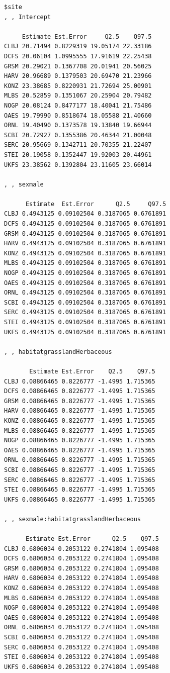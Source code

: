 \documentclass[
  13,
  letterpaper,
]{report}
\begin{document}
\begin{verbatim}
$site
, , Intercept

     Estimate Est.Error     Q2.5    Q97.5
CLBJ 20.71494 0.8229319 19.05174 22.33186
DCFS 20.06104 1.0995555 17.91619 22.25438
GRSM 20.29021 0.1367708 20.01941 20.56025
HARV 20.96689 0.1379503 20.69470 21.23966
KONZ 23.38685 0.8220931 21.72694 25.00901
MLBS 20.52859 0.1351067 20.25904 20.79482
NOGP 20.08124 0.8477177 18.40041 21.75486
OAES 19.79990 0.8518674 18.05588 21.40660
ORNL 19.40490 0.1373578 19.13840 19.66944
SCBI 20.72927 0.1355386 20.46344 21.00048
SERC 20.95669 0.1342711 20.70355 21.22407
STEI 20.19058 0.1352447 19.92003 20.44961
UKFS 23.38562 0.1392804 23.11605 23.66014

, , sexmale

      Estimate  Est.Error      Q2.5     Q97.5
CLBJ 0.4943125 0.09102504 0.3187065 0.6761891
DCFS 0.4943125 0.09102504 0.3187065 0.6761891
GRSM 0.4943125 0.09102504 0.3187065 0.6761891
HARV 0.4943125 0.09102504 0.3187065 0.6761891
KONZ 0.4943125 0.09102504 0.3187065 0.6761891
MLBS 0.4943125 0.09102504 0.3187065 0.6761891
NOGP 0.4943125 0.09102504 0.3187065 0.6761891
OAES 0.4943125 0.09102504 0.3187065 0.6761891
ORNL 0.4943125 0.09102504 0.3187065 0.6761891
SCBI 0.4943125 0.09102504 0.3187065 0.6761891
SERC 0.4943125 0.09102504 0.3187065 0.6761891
STEI 0.4943125 0.09102504 0.3187065 0.6761891
UKFS 0.4943125 0.09102504 0.3187065 0.6761891

, , habitatgrasslandHerbaceous

       Estimate Est.Error    Q2.5    Q97.5
CLBJ 0.08866465 0.8226777 -1.4995 1.715365
DCFS 0.08866465 0.8226777 -1.4995 1.715365
GRSM 0.08866465 0.8226777 -1.4995 1.715365
HARV 0.08866465 0.8226777 -1.4995 1.715365
KONZ 0.08866465 0.8226777 -1.4995 1.715365
MLBS 0.08866465 0.8226777 -1.4995 1.715365
NOGP 0.08866465 0.8226777 -1.4995 1.715365
OAES 0.08866465 0.8226777 -1.4995 1.715365
ORNL 0.08866465 0.8226777 -1.4995 1.715365
SCBI 0.08866465 0.8226777 -1.4995 1.715365
SERC 0.08866465 0.8226777 -1.4995 1.715365
STEI 0.08866465 0.8226777 -1.4995 1.715365
UKFS 0.08866465 0.8226777 -1.4995 1.715365

, , sexmale:habitatgrasslandHerbaceous

      Estimate Est.Error      Q2.5    Q97.5
CLBJ 0.6806034 0.2053122 0.2741804 1.095408
DCFS 0.6806034 0.2053122 0.2741804 1.095408
GRSM 0.6806034 0.2053122 0.2741804 1.095408
HARV 0.6806034 0.2053122 0.2741804 1.095408
KONZ 0.6806034 0.2053122 0.2741804 1.095408
MLBS 0.6806034 0.2053122 0.2741804 1.095408
NOGP 0.6806034 0.2053122 0.2741804 1.095408
OAES 0.6806034 0.2053122 0.2741804 1.095408
ORNL 0.6806034 0.2053122 0.2741804 1.095408
SCBI 0.6806034 0.2053122 0.2741804 1.095408
SERC 0.6806034 0.2053122 0.2741804 1.095408
STEI 0.6806034 0.2053122 0.2741804 1.095408
UKFS 0.6806034 0.2053122 0.2741804 1.095408
\end{verbatim}
\end{document}
